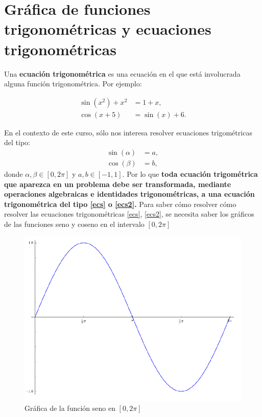 \documentclass[10pt]{article}
\newcommand{\2}[1]{\hspace{-0.93cm}\colorbox{color1}{\hspace{0.07cm} \parbox{17cm}{\vspace{0.2cm} #1}\hspace*{0.07cm} }}
\newcommand{\3}[1]{\hspace{-0.93cm}\colorbox{color7}{\hspace{0.07cm} \parbox{17cm}{\vspace{0.2cm} #1}\hspace*{0.07cm} }}
\theoremstyle{theorem}
\numberwithin{equation}{section}
\begin{document}
\section{Gr\'afica de funciones trigonom\'etricas y ecuaciones trigonom\'etricas}

Una \textbf{ecuaci\'on trigonom\'etrica} es una ecuaci\'on en el que est\'a involucrada alguna funci\'on trigonom\'etrica. Por ejemplo:

\begin{align*}
\sin(x^2)+x^2&=1+x,\\
\cos(x+5)&=\sin(x)+6.
\end{align*} 

En el contexto de este curso, s\'olo nos interesa resolver ecuaciones trigom\'etricas del tipo:
\begin{align}\label{ecs}
\sin(\alpha)&=a,\\
\cos(\beta)&=b,\label{ecs2}
\end{align}
donde $\alpha,\beta\in [0,2\pi]$ y $a,b\in [-1,1]$. Por lo que \textbf{toda ecuaci\'on trigom\'etrica que aparezca en un problema debe ser transformada, mediante operaciones algebraicas e identidades trigonom\'etricas, a una ecuaci\'on trigonom\'etrica del tipo \ref{ecs} o \ref{ecs2}.}
Para saber c\'omo resolver c\'omo resolver las ecuaciones trigonom\'etricas \ref{ecs}, \ref{ecs2}, se necesita saber los gr\'aficos de las funciones seno y coseno en el intervalo $[0,2\pi]$

\begin{figure}[h!]
\centering
\includegraphics[scale=0.3]{sine}
\caption{Gr\'afica de la funci\'on seno en $[0,2\pi]$}
\label{sine}
\end{figure}
\end{document}
